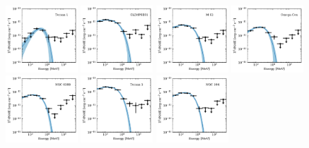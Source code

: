 \documentclass[doublespace,draft,nopageskip]{VTthesis} %
\begin{document}
\begin{appendices}
\begin{figure}
\includegraphics[width=0.24\textwidth]{Figures/Globular/spectra/PLE_spectrum_27.pdf}
\includegraphics[width=0.24\textwidth]{Figures/Globular/spectra/PLE_spectrum_1.pdf}
\includegraphics[width=0.24\textwidth]{Figures/Globular/spectra/PLE_spectrum_11.pdf}
\includegraphics[width=0.24\textwidth]{Figures/Globular/spectra/PLE_spectrum_6.pdf}
\includegraphics[width=0.24\textwidth]{Figures/Globular/spectra/PLE_spectrum_15.pdf}
\includegraphics[width=0.24\textwidth]{Figures/Globular/spectra/PLE_spectrum_29.pdf}
\includegraphics[width=0.24\textwidth]{Figures/Globular/spectra/PLE_spectrum_3.pdf}
\end{figure}


\end{appendices}
\end{document}
